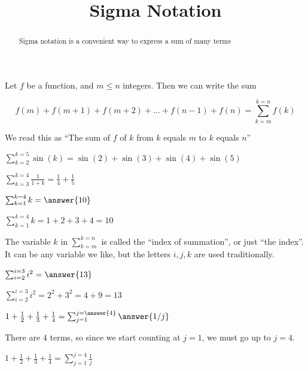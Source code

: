 \documentclass{ximera}
\title[Dig-In:]{Sigma Notation}
\begin{document}
\begin{abstract}
	Sigma notation is a convenient way to express a sum of many terms
\end{abstract}

\begin{definition}
	Let $f$ be a function, and $m \leq n$ integers.  Then we can write the sum 
	
	\[ f(m)+f(m+1)+f(m+2)+...+f(n-1)+f(n) = \sum_{k=m}^{k=n} f(k)\] 
	
	We read this as ``The sum of $f$ of $k$ from $k$ equals $m$ to $k$ equals $n$''
	
	\end{definition}

\begin{example}
$\sum_{k=2}^{k=5} \sin(k) = \sin(2)+\sin(3)+\sin(4)+\sin(5)$
\end{example}

\begin{example}
$\sum_{k=3}^{k=4} \frac{1}{1+k} = \frac{1}{4}+\frac{1}{5}$
\end{example}

\begin{question}
	$\sum_{k=1}^{k=4} k  = \answer{10}$
	\begin{hint}
		$\sum_{k=1}^{k=4} k  = 1+2+3+4=10$
	\end{hint}
\end{question}

The variable $k$ in $\sum_{k=m}^{k=n}$ is called the ``index of summation'', or just ``the index''.  It can be any variable we like, but the letters $i,j,k$ are used traditionally.

\begin{question}
$\sum_{i=2}^{i=3} i^2  = \answer{13}$
\begin{hint}
	$\sum_{i=2}^{i=3} i^2  = 2^2+3^2 = 4+9=13$
\end{hint}
\end{question}

\begin{question}
	$1+\frac{1}{2} + \frac{1}{3} + \frac{1}{4} = \sum_{j=1}^{j= \answer{4}} \answer{1/j}$
	\begin{hint}
		There are $4$ terms, so since we start counting at $j=1$, we must go up to $j=4$.
	\end{hint}
	\begin{hint}
		$1+\frac{1}{2} + \frac{1}{3} + \frac{1}{4} = \sum_{j=1}^{j= 4} \frac{1}{j}$
	\end{hint}
\end{question}
\end{document}
